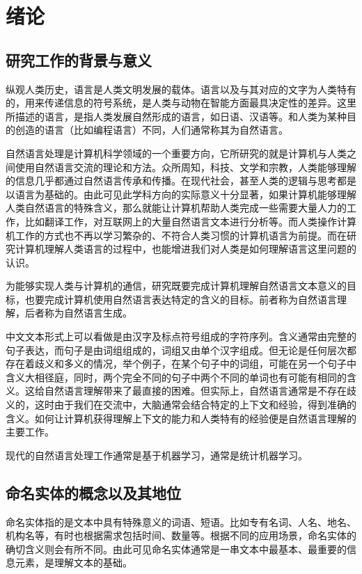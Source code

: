 
\chapter{绪论}
\section{研究工作的背景与意义}
纵观人类历史，语言是人类文明发展的载体。语言以及与其对应的文字为人类特有的，用来传递信息的符号系统，是人类与动物在智能方面最具决定性的差异。这里所描述的语言，是指人类发展自然形成的语言，如日语、汉语等。和人类为某种目的创造的语言（比如编程语言）不同，人们通常称其为自然语言。

自然语言处理是计算机科学领域的一个重要方向，它所研究的就是计算机与人类之间使用自然语言交流的理论和方法。众所周知，科技、文学和宗教，人类能够理解的信息几乎都通过自然语言传承和传播。在现代社会，甚至人类的逻辑与思考都是以语言为基础的。由此可见此学科方向的实际意义十分显著，如果计算机能够理解人类自然语言的特殊含义，那么就能让计算机帮助人类完成一些需要大量人力的工作，比如翻译工作，对互联网上的大量自然语言文本进行分析等。而人类操作计算机工作的方式也不再以学习繁杂的、不符合人类习惯的计算机语言为前提。而在研究计算机理解人类语言的过程中，也能增进我们对人类是如何理解语言这里问题的认识。

为能够实现人类与计算机的通信，研究既要完成计算机理解自然语言文本意义的目标，也要完成计算机使用自然语言表达特定的含义的目标。前者称为自然语言理解，后者称为自然语言生成。

中文文本形式上可以看做是由汉字及标点符号组成的字符序列。含义通常由完整的句子表达，而句子是由词组组成的，词组又由单个汉字组成。但无论是任何层次都存在着歧义和多义的情况，举个例子，在某个句子中的词组，可能在另一个句子中含义大相径庭，同时，两个完全不同的句子中两个不同的单词也有可能有相同的含义。这给自然语言理解带来了最直接的困难。但实际上，自然语言通常是不存在歧义的，这时由于我们在交流中，大脑通常会结合特定的上下文和经验，得到准确的含义。如何让计算机获得理解上下文的能力和人类特有的经验便是自然语言理解的主要工作。

现代的自然语言处理工作通常是基于机器学习，通常是统计机器学习。
\section{命名实体的概念以及其地位}
命名实体指的是文本中具有特殊意义的词语、短语。比如专有名词、人名、地名、机构名等，有时也根据需求包括时间、数量等。根据不同的应用场景，命名实体的确切含义则会有所不同。由此可见命名实体通常是一串文本中最基本、最重要的信息元素，是理解文本的基础。

